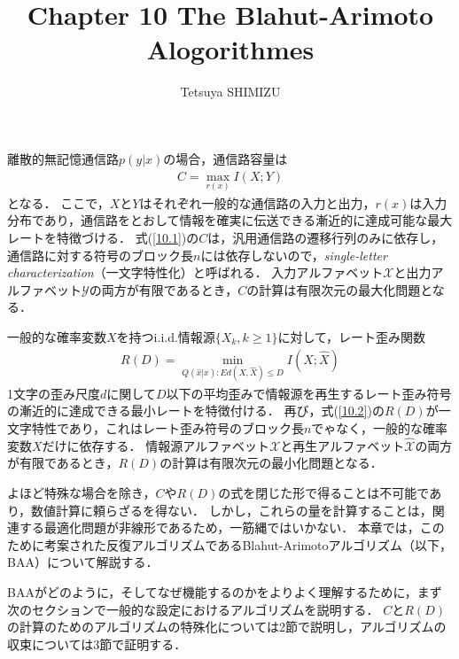 \documentclass{ltjsarticle}
\begin{document}
\title{Chapter 10 The Blahut-Arimoto Alogorithmes}
\author{Tetsuya SHIMIZU}
\maketitle

離散的無記憶通信路$p(y|x)$の場合，通信路容量は
\begin{eqnarray}
  \label{10.1}
  C = \max_{r(x)} I(X;Y)
\end{eqnarray}
となる．
ここで，$X$と$Y$はそれぞれ一般的な通信路の入力と出力，$r(x)$は入力分布であり，通信路をとおして情報を確実に伝送できる漸近的に達成可能な最大レートを特徴づける．
式(\ref{10.1})の$C$は，汎用通信路の遷移行列のみに依存し，通信路に対する符号のブロック長$n$には依存しないので，\textit{single-letter characterization}（一文字特性化）と呼ばれる．
入力アルファベット$\mathcal{X}$と出力アルファベット$\mathcal{Y}$の両方が有限であるとき，$C$の計算は有限次元の最大化問題となる．

一般的な確率変数$X$を持つi.i.d.情報源$\{X_k, k \geq 1\}$に対して，レート歪み関数
\begin{eqnarray}
  \label{10.2}
  R(D) = \min_{Q(\hat{x}|x): Ed(X,\hat{X}) \leq D} I(X;\hat{X})
\end{eqnarray}
1文字の歪み尺度$d$に関して$D$以下の平均歪みで情報源を再生するレート歪み符号の漸近的に達成できる最小レートを特徴付ける．
再び，式(\ref{10.2})の$R(D)$が一文字特性であり，これはレート歪み符号のブロック長$n$でゃなく，一般的な確率変数$X$だけに依存する．
情報源アルファベット$\mathcal{X}$と再生アルファベット$\hat{\mathcal{X}}$の両方が有限であるとき，$R(D)$の計算は有限次元の最小化問題となる．

よほど特殊な場合を除き，$C$や$R(D)$の式を閉じた形で得ることは不可能であり，数値計算に頼らざるを得ない．
しかし，これらの量を計算することは，関連する最適化問題が非線形であるため，一筋縄ではいかない．
本章では，このために考案された反復アルゴリズムであるBlahut-Arimotoアルゴリズム（以下，BAA）について解説する．

BAAがどのように，そしてなぜ機能するのかをよりよく理解するために，まず次のセクションで一般的な設定におけるアルゴリズムを説明する．
$C$と$R(D)$の計算のためのアルゴリズムの特殊化については2節で説明し，アルゴリズムの収束については3節で証明する．
\end{document}
